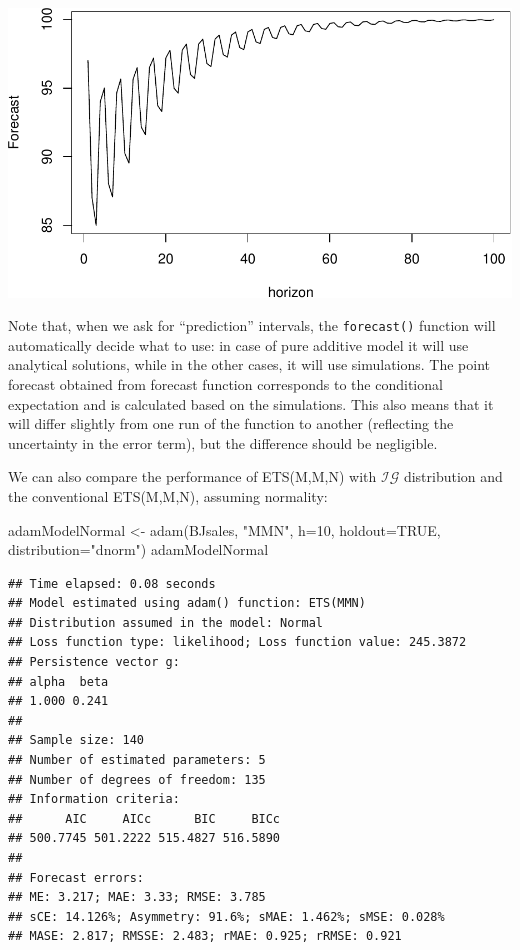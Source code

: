 \documentclass[
]{book}
\newenvironment{Shaded}{\begin{snugshade}}{\end{snugshade}}
\newcommand{\AttributeTok}[1]{\textcolor[rgb]{0.77,0.63,0.00}{#1}}
\newcommand{\ConstantTok}[1]{\textcolor[rgb]{0.00,0.00,0.00}{#1}}
\newcommand{\DecValTok}[1]{\textcolor[rgb]{0.00,0.00,0.81}{#1}}
\newcommand{\FunctionTok}[1]{\textcolor[rgb]{0.00,0.00,0.00}{#1}}
\newcommand{\NormalTok}[1]{#1}
\newcommand{\OtherTok}[1]{\textcolor[rgb]{0.56,0.35,0.01}{#1}}
\newcommand{\StringTok}[1]{\textcolor[rgb]{0.31,0.60,0.02}{#1}}
\theoremstyle{definition}
\theoremstyle{definition}
\theoremstyle{definition}
\theoremstyle{definition}
\theoremstyle{remark}
\begin{document}
\includegraphics{adam_files/figure-latex/unnamed-chunk-43-1.pdf}

Note that, when we ask for ``prediction'' intervals, the \texttt{forecast()} function will automatically decide what to use: in case of pure additive model it will use analytical solutions, while in the other cases, it will use simulations. The point forecast obtained from forecast function corresponds to the conditional expectation and is calculated based on the simulations. This also means that it will differ slightly from one run of the function to another (reflecting the uncertainty in the error term), but the difference should be negligible.

We can also compare the performance of ETS(M,M,N) with \(\mathcal{IG}\) distribution and the conventional ETS(M,M,N), assuming normality:

\begin{Shaded}
\begin{Highlighting}[]
\NormalTok{adamModelNormal }\OtherTok{\textless{}{-}} \FunctionTok{adam}\NormalTok{(BJsales, }\StringTok{"MMN"}\NormalTok{, }\AttributeTok{h=}\DecValTok{10}\NormalTok{, }\AttributeTok{holdout=}\ConstantTok{TRUE}\NormalTok{,}
                        \AttributeTok{distribution=}\StringTok{"dnorm"}\NormalTok{)}
\NormalTok{adamModelNormal}
\end{Highlighting}
\end{Shaded}

\begin{verbatim}
## Time elapsed: 0.08 seconds
## Model estimated using adam() function: ETS(MMN)
## Distribution assumed in the model: Normal
## Loss function type: likelihood; Loss function value: 245.3872
## Persistence vector g:
## alpha  beta 
## 1.000 0.241 
## 
## Sample size: 140
## Number of estimated parameters: 5
## Number of degrees of freedom: 135
## Information criteria:
##      AIC     AICc      BIC     BICc 
## 500.7745 501.2222 515.4827 516.5890 
## 
## Forecast errors:
## ME: 3.217; MAE: 3.33; RMSE: 3.785
## sCE: 14.126%; Asymmetry: 91.6%; sMAE: 1.462%; sMSE: 0.028%
## MASE: 2.817; RMSSE: 2.483; rMAE: 0.925; rRMSE: 0.921
\end{verbatim}
\end{document}
